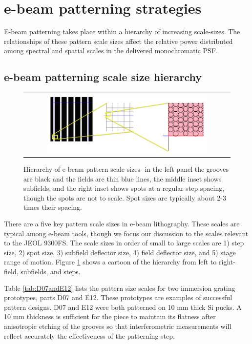 \documentclass[]{spie}  %
\begin{document}
\section{e-beam patterning strategies}
E-beam patterning takes place within a hierarchy of increasing scale-sizes.  The relationships of these pattern scale sizes affect the relative power distributed among spectral and spatial scales in the delivered monochromatic PSF.

\subsection{e-beam patterning scale size hierarchy}

\begin{figure}
\begin{center}
 \begin{tabular}{c}
    \includegraphics[width=0.8\textwidth]{figs/Field_sizes_cascade_02.png}
   \end{tabular}
  \end{center}
  \caption[e-beam Hierarchy]{\label{fig:Hierarchy} Hierarchy of e-beam pattern scale sizes- in the left panel the grooves are black and the fields are thin blue lines, the middle inset shows subfields, and the right inset shows spots at a regular step spacing, though the spots are not to scale.  Spot sizes are typically about 2-3 times their spacing.}
\end{figure}


There are a five key pattern scale sizes in e-beam lithography.  These scales are typical among e-beam tools, though we focus our discussion to the scales relevant to the JEOL 9300FS.  The scale sizes in order of small to large scales are 1) step size, 2) spot size, 3) subfield deflector size, 4) field deflector size, and 5) stage range of motion.  Figure \ref{fig:Hierarchy} shows a cartoon of the hierarchy from left to right- field, subfields, and steps.

Table \ref{tab:D07andE12} lists the pattern size scales for two immersion grating prototypes, parts D07 and E12.  These prototypes are examples of successful pattern designs.  D07 and E12 were both patterned on 10 mm thick Si pucks.  A 10 mm thickness is sufficient for the piece to maintain its flatness after anisotropic etching of the grooves so that interferometric measurements will reflect accurately the effectiveness of the patterning step.
\end{document}
